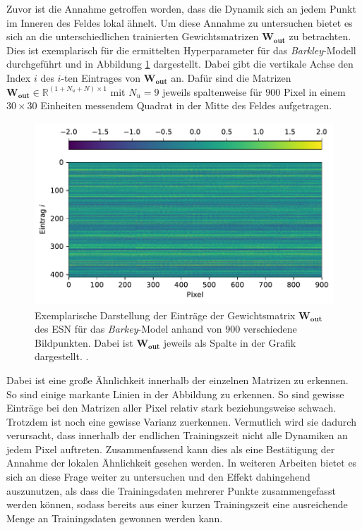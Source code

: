 Zuvor ist die Annahme getroffen worden, dass die Dynamik sich an jedem Punkt im Inneren des Feldes lokal ähnelt. Um diese Annahme zu untersuchen bietet es sich an die unterschiedlichen trainierten Gewichtsmatrizen $\mathbf{W_{out}}$ zu betrachten. Dies ist exemplarisch für die ermittelten Hyperparameter für das \textit{Barkley}-Modell durchgeführt und in Abbildung \ref{fig:exp_cross_esn_weights} dargestellt. Dabei gibt die vertikale Achse den Index $i$ des $i$-ten Eintrages von $\mathbf{W_{out}}$ an. Dafür sind die Matrizen $\mathbf{W_{out}} \in \mathbb{R}^{(1 + N_u + N) \times 1}$ mit $N_u = 9$ jeweils spaltenweise für $900$ Pixel in einem $30 \times 30$ Einheiten messendem Quadrat in der Mitte des Feldes aufgetragen.

\begin{figure}[h]
	\centering
	\includegraphics[height=2.7in]{figures/results/cross_prediction/weights.pdf}
	\setcapmargin[1cm]{1cm}
	\caption{Exemplarische Darstellung der Einträge der Gewichtsmatrix $\mathbf{W_{out}}$ des \textsc{ESN} für das \textit{Barkey}-Model anhand von $900$ verschiedene Bildpunkten. Dabei ist $\mathbf{W_{out}}$ jeweils als Spalte in der Grafik dargestellt.  .}
	\label{fig:exp_cross_esn_weights}
\end{figure}

Dabei ist eine große Ähnlichkeit innerhalb der einzelnen Matrizen zu erkennen. So sind einige markante Linien in der Abbildung zu erkennen. So sind gewisse Einträge bei den Matrizen aller Pixel relativ stark beziehungsweise schwach. Trotzdem ist noch eine gewisse Varianz zuerkennen. Vermutlich wird sie dadurch verursacht, dass innerhalb der endlichen Trainingszeit nicht alle Dynamiken an jedem Pixel auftreten. Zusammenfassend kann dies als eine Bestätigung der Annahme der lokalen Ähnlichkeit gesehen werden. In weiteren Arbeiten bietet es sich an diese Frage weiter zu untersuchen und den Effekt dahingehend auszunutzen, als dass die Trainingsdaten mehrerer Punkte zusammengefasst werden können, sodass bereits aus einer kurzen Trainingszeit eine ausreichende Menge an Trainingsdaten gewonnen werden kann.

